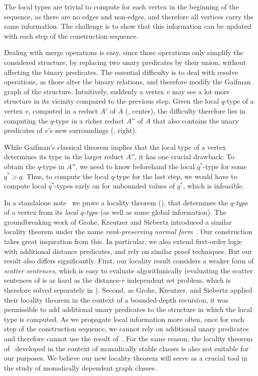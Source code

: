 \documentclass[11pt]{article}
\theoremstyle{remark}
\begin{document}
     The local types are trivial to compute for each vertex in the beginning of the sequence, as there are no edges and non-edges,
     and therefore all vertices carry the same information.
     The challenge is to show that this information can be updated
     with each step of the construction sequence.

     Dealing with merge operations is easy, since those operations only simplify the considered structure,
     by replacing two unary predicates by their union, without affecting the binary predicates.
     The essential difficulty is to deal with resolve operations, as those alter the binary relations,
     and therefore modify the Gaifman graph of the structure.
     Intuitively, suddenly a vertex $v$ may see a lot more structure in its vicinity compared to the previous step.
     Given the local \(q\)-type of a vertex \(v\), computed in a reduct \(A'\) of \(A\) (, center), the difficulty therefore lies
     in computing the \(q\)-type in a richer reduct \(A''\) of \(A\)
     that also contains the unary predicates of \(v\)'s new surroundings (, right).

     While Gaifman's classical theorem implies that the local type of a vertex determines its type in the larger reduct \(A''\), it has one crucial drawback:
     To obtain the \(q\)-type in \(A''\), we need to know beforehand the local \(q^*\)-type for some \(q^* > q\).
     Thus, to compute the local \(q\)-type for the last step, we would have to compute local \(q^*\)-types early on for unbounded values of \(q^*\), which is infeasible.

     In a standalone note~\cite{locality-note} we prove a locality theorem (), that determines the \emph{\(q\)-type} of a vertex from its \emph{local \(q\)-type} (as well as some global information).
     The groundbreaking work of Grohe, Kreutzer and Siebertz introduced a similar locality theorem
     under the name \emph{rank-preserving normal form}~\cite{gks}.
     Our construction takes great inspiration from this.
     In particular, we also extend first-order logic with additional distance predicates, and rely on similar proof techniques.
     But our result also  differs significantly.
     First, our locality result considers a weaker form of \emph{scatter sentences}, which is easy to evaluate algorithmically (evaluating the scatter sentences of \cite{gks} is as hard as the distance-$r$ independent set problem, which is therefore solved separately in \cite{gks}).
     Second, as Grohe, Kreutzer, and Siebertz applied their locality theorem in the context of a bounded-depth recursion,
     it was permissible to add additional unary predicates to the structure in which the local type is computed.
     As we propagate local information more often, once for each step of the construction sequence,
     we cannot rely on additional unary predicates and therefore cannot use the result of~\cite{gks}.
     For the same reason, the locality theorem of~\cite{ms-mc1} developed in the context of monadically stable classes is also not suitable for our purposes.
     We believe our new locality theorem will serve as a crucial tool in the study of monadically dependent graph classes.
\end{document}
